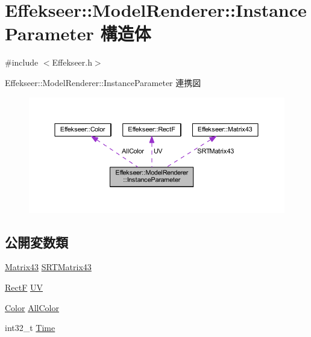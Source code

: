 \hypertarget{struct_effekseer_1_1_model_renderer_1_1_instance_parameter}{}\section{Effekseer\+:\+:Model\+Renderer\+:\+:Instance\+Parameter 構造体}
\label{struct_effekseer_1_1_model_renderer_1_1_instance_parameter}


{\ttfamily \#include $<$Effekseer.\+h$>$}



Effekseer\+:\+:Model\+Renderer\+:\+:Instance\+Parameter 連携図\nopagebreak
\begin{figure}[H]
\begin{center}
\leavevmode
\includegraphics[width=350pt]{struct_effekseer_1_1_model_renderer_1_1_instance_parameter__coll__graph}
\end{center}
\end{figure}
\subsection*{公開変数類}
\begin{DoxyCompactItemize}
\item 
\mbox{\hyperlink{struct_effekseer_1_1_matrix43}{Matrix43}} \mbox{\hyperlink{struct_effekseer_1_1_model_renderer_1_1_instance_parameter_a9f939c1f03b94d5c76eea7c7ff461da3}{S\+R\+T\+Matrix43}}
\item 
\mbox{\hyperlink{struct_effekseer_1_1_rect_f}{RectF}} \mbox{\hyperlink{struct_effekseer_1_1_model_renderer_1_1_instance_parameter_a8093686e2945cecdfcb99420bacca07d}{UV}}
\item 
\mbox{\hyperlink{struct_effekseer_1_1_color}{Color}} \mbox{\hyperlink{struct_effekseer_1_1_model_renderer_1_1_instance_parameter_a5d22e2c41cd40b037704fc7c41d7688a}{All\+Color}}
\item 
int32\+\_\+t \mbox{\hyperlink{struct_effekseer_1_1_model_renderer_1_1_instance_parameter_a4235d902c37f8a39353fc27bbc0ea532}{Time}}
\end{DoxyCompactItemize}


